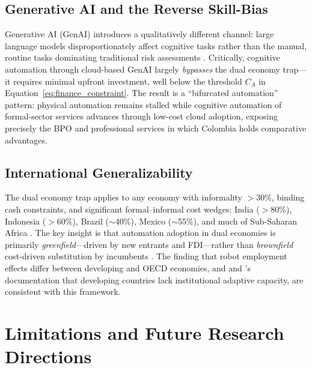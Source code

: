 \documentclass[5p,times,authoryear]{elsarticle}
\begin{document}
\subsection{Generative AI and the Reverse Skill-Bias}
\label{subsec:genai}

Generative AI (GenAI) introduces a qualitatively different channel: large language models disproportionately affect cognitive tasks rather than the manual, routine tasks dominating traditional risk assessments \citep{eloundou2023gpts, brynjolfsson2023generative, acemoglu2024aijobs}. Critically, cognitive automation through cloud-based GenAI largely \emph{bypasses} the dual economy trap---it requires minimal upfront investment, well below the threshold $C_A$ in Equation~\eqref{eq:finance_constraint}. The result is a ``bifurcated automation'' pattern: physical automation remains stalled while cognitive automation of formal-sector services advances through low-cost cloud adoption, exposing precisely the BPO and professional services in which Colombia holds comparative advantages.

\subsection{International Generalizability}
\label{subsec:generalizability}

The dual economy trap applies to any economy with informality $>$30\%, binding cash constraints, and significant formal--informal cost wedges: India ($>$80\%), Indonesia ($>$60\%), Brazil ($\sim$40\%), Mexico ($\sim$55\%), and much of Sub-Saharan Africa \citep{laporta2014, arias2023informality, diao2021manufacturing}. The key insight is that automation adoption in dual economies is primarily \emph{greenfield}---driven by new entrants and FDI---rather than \emph{brownfield} cost-driven substitution by incumbents \citep{artuc2023robots, hallward2018trouble}. The \citet{carbonero2020robots} finding that robot employment effects differ between developing and OECD economies, and \citet{gmyrek2023generative} and \citet{oecd2025voces}'s documentation that developing countries lack institutional adaptive capacity, are consistent with this framework.

\FloatBarrier


\section{Limitations and Future Research Directions}
\label{sec:limitations}
\end{document}
